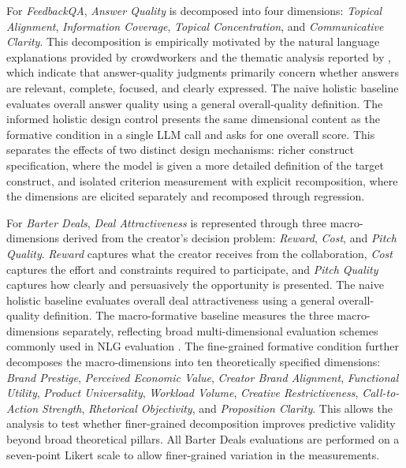 For \textit{FeedbackQA}, \textit{Answer Quality} is decomposed into four dimensions: \textit{Topical Alignment}, \textit{Information Coverage}, \textit{Topical Concentration}, and \textit{Communicative Clarity}. This decomposition is empirically motivated by the natural language explanations provided by crowdworkers and the thematic analysis reported by \citet{li_using_2022}, which indicate that answer-quality judgments primarily concern whether answers are relevant, complete, focused, and clearly expressed. The naive holistic baseline evaluates overall answer quality using a general overall-quality definition. The informed holistic design control presents the same dimensional content as the formative condition in a single LLM call and asks for one overall score. This separates the effects of two distinct design mechanisms: richer construct specification, where the model is given a more detailed definition of the target construct, and isolated criterion measurement with explicit recomposition, where the dimensions are elicited separately and recomposed through regression.

For \textit{Barter Deals}, \textit{Deal Attractiveness} is represented through three macro-dimensions derived from the creator's decision problem: \textit{Reward}, \textit{Cost}, and \textit{Pitch Quality}. \textit{Reward} captures what the creator receives from the collaboration, \textit{Cost} captures the effort and constraints required to participate, and \textit{Pitch Quality} captures how clearly and persuasively the opportunity is presented. The naive holistic baseline evaluates overall deal attractiveness using a general overall-quality definition. The macro-formative baseline measures the three macro-dimensions separately, reflecting broad multi-dimensional evaluation schemes commonly used in NLG evaluation \citep{fabbri_summeval_2021, liu_g-eval_2023, zhongUnifiedMultiDimensionalEvaluator2022a}. The fine-grained formative condition further decomposes the macro-dimensions into ten theoretically specified dimensions: \textit{Brand Prestige}, \textit{Perceived Economic Value}, \textit{Creator Brand Alignment}, \textit{Functional Utility}, \textit{Product Universality}, \textit{Workload Volume}, \textit{Creative Restrictiveness}, \textit{Call-to-Action Strength}, \textit{Rhetorical Objectivity}, and \textit{Proposition Clarity}. This allows the analysis to test whether finer-grained decomposition improves predictive validity beyond broad theoretical pillars. All Barter Deals evaluations are performed on a seven-point Likert scale to allow finer-grained variation in the measurements.


